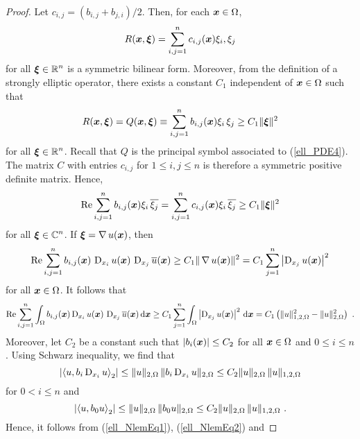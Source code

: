 \begin{proof}
Let $\displaystyle c_{i,j} = (b_{i,j}+ b_{j,i})/2$.  Then, for
each ${\bm{x}} \in \Omega$,
\[
R({\bm{x}},{\bm{\xi}}) = \sum_{i,j=1}^n c_{i,j}({\bm{x}}) \xi_i,\xi_j
\]
for all $\displaystyle {\bm{\xi}} \in \mathbb{R}^n$
is a symmetric bilinear form.  Moreover, from the definition
of a strongly elliptic operator, there exists a constant
$C_1$ independent of ${\bm{x}} \in \Omega$ such that
\[
R({\bm{x}}, {\bm{\xi}}) = Q({\bm{x}}, {\bm{\xi}})
\equiv \sum_{i,j=1}^n b_{i,j}({\bm{x}}) \xi_i\,\xi_j \geq C_1 \|{\bm{\xi}}\|^2
\]
for all $\displaystyle {\bm{\xi}} \in \mathbb{R}^n$.
Recall that $Q$ is the principal symbol associated to (\ref{ell_PDE4}).
The matrix $C$ with entries $c_{i,j}$ for $1\leq i,j \leq n$ is
therefore a symmetric positive definite \nn matrix.  Hence,
\begin{equation} \label{ell_stell_coerc_eq}
\operatorname{Re} \sum_{i,j=1}^n b_{i,j}({\bm{x}}) \xi_i\,\overline{\xi_j} =
\sum_{i,j=1}^n c_{i,j}({\bm{x}}) \xi_i\,\overline{\xi_j} \geq C_1
\|{\bm{\xi}}\|^2
\end{equation}
for all $\displaystyle {\bm{\xi}} \in \mathbb{C}^n$.
If ${\bm{\xi}} = \operatorname{\nabla} u({\bm{x}})$, then
\[
\operatorname{Re} \sum_{i,j=1}^n b_{i,j}({\bm{x}})\, \operatorname{D}_{x_i}u({\bm{x}})
 \,\operatorname{D}_{x_j}\overline{u}({\bm{x}}) \geq C_1 \|\operatorname{\nabla} u({\bm{x}})\|^2
= C_1 \sum_{j=1}^n \left| \operatorname{D}_{x_j} u({\bm{x}}) \right|^2
\]
for all ${\bm{x}} \in \Omega$.  It follows that
\begin{equation} \label{ell_NlemEq1}
\operatorname{Re} \sum_{i,j=1}^n \int_\Omega b_{i,j}({\bm{x}}) \operatorname{D}_{x_i}u({\bm{x}})
 \,\operatorname{D}_{x_j}\overline{u}({\bm{x}}) \,\mathrm{d}{{\bm{x}}} \geq C_1 
\sum_{j=1}^n \int_\Omega \left|\operatorname{D}_{x_j} u({\bm{x}})\right|^2 \,\mathrm{d}{{\bm{x}}}
= C_1 \left( \|u\|_{1,2,\Omega}^2 - \|u\|_{2,\Omega}^2 \right) \  .
\end{equation}
Moreover, let $C_2$ be a constant such that $|b_i({\bm{x}})| \leq C_2$ for all
${\bm{x}} \in \Omega$ and $0\leq i \leq n$.  Using Schwarz inequality,
we find that
\begin{equation} \label{ell_NlemEq2}
\left| \left\langle{u} , {b_i \operatorname{D}_{x_i} u}\right\rangle_2 \right| \leq
\|u\|_{2,\Omega} \,\| b_i \operatorname{D}_{x_i} u \|_{2,\Omega}
\leq C_2 \|u\|_{2,\Omega} \,\|u\|_{1,2,\Omega}
\end{equation}
for $0 <i \leq n$ and
\begin{equation} \label{ell_NlemEq3}
\left| \left\langle{u} , {b_0 u}\right\rangle_2 \right| \leq 
\|u\|_{2,\Omega} \, \|b_0 u \|_{2,\Omega}
\leq C_2 \|u\|_{2,\Omega} \, \|u\|_{1,2,\Omega} \ .
\end{equation}
Hence, it follows from (\ref{ell_NlemEq1}), (\ref{ell_NlemEq2}) and

\end{proof}
